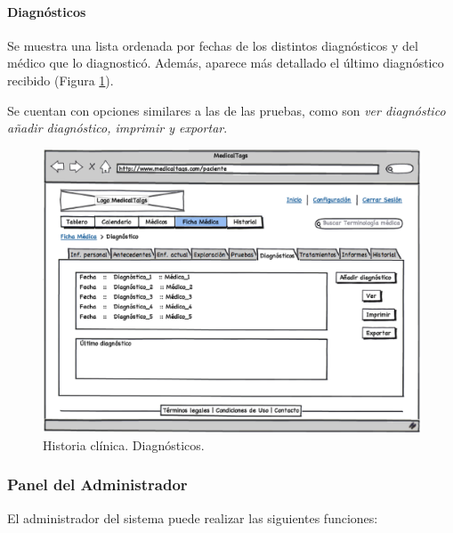 \documentclass[a4paper,oneside,11pt]{book}
\begin{document}
		
		\paragraph{Diagnósticos} %
		\label{par:diagnosticos}
		
			Se muestra una lista ordenada por fechas de los distintos diagnósticos y del médico que lo diagnosticó. Además, aparece más detallado el último diagnóstico recibido (Figura \ref{fig:diagnostico}). 
			
			Se cuentan con opciones similares a las de las pruebas, como son \textit{ver diagnóstico} \textit{añadir diagnóstico, imprimir y exportar}.
			
			
			\begin{figure}[H]
			  \centering
			    \includegraphics[width=12cm]{img/eps/36_Diagnosticos_Pacientes.eps}
			  \caption{Historia clínica. Diagnósticos.}
			  \label{fig:diagnostico}
			\end{figure}
		
		
	\subsubsection{Panel del Administrador} %
		\label{sub:panel_administrador}
	
		El administrador del sistema puede realizar las siguientes funciones:
		
\end{document}
